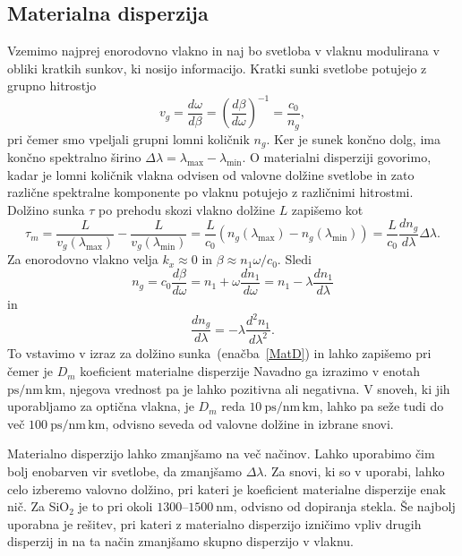 \subsection*{Materialna disperzija}
Vzemimo najprej enorodovno vlakno in naj bo svetloba v vlaknu modulirana
v obliki kratkih sunkov, ki nosijo informacijo. Kratki sunki svetlobe
potujejo z grupno hitrostjo 
\begin{equation}
v_{g}=\frac{d\omega}{d\beta}=\left(\frac{d\beta}{d\omega}\right)^{-1} = \frac{c_0}{n_g},
\label{9.51}
\end{equation}
pri čemer smo vpeljali grupni lomni količnik $n_g$.
Ker je sunek končno dolg, ima končno spektralno širino $\Delta \lambda=\lambda_{\mathrm{max}}-\lambda_{\mathrm{min}}$. 
O materialni disperziji govorimo, kadar je lomni količnik vlakna odvisen od
valovne dolžine svetlobe in zato različne spektralne komponente po vlaknu potujejo z različnimi
hitrostmi. Dolžino sunka $\tau$ po prehodu skozi vlakno dolžine $L$ zapišemo kot
\begin{equation}
\tau_m = \frac{L}{v_g(\lambda_{\mathrm{max}})} - \frac{L}{v_g(\lambda_{\mathrm{min}})} = 
\frac{L}{c_0}\left(n_g(\lambda_{\mathrm{max}}) - n_g(\lambda_{\mathrm{min}}) \right) 
= \frac{L}{c_0}\frac{d n_g}{d \lambda}\Delta \lambda.
\label{MatD}
\end{equation}
Za enorodovno vlakno velja $k_x \approx 0$ in $\beta \approx n_1 \omega/c_0$. 
Sledi
\begin{equation}
n_g = c_0 \frac{d\beta}{d\omega} = n_1 + \omega \frac{d n_1}{d\omega} = n_1 - \lambda 
\frac{dn_1}{d\lambda}
\end{equation}
in
\begin{equation}
\frac{dn_g}{d\lambda} = -\lambda\frac{d^2n_1}{d\lambda^2}.
\end{equation}
To vstavimo v izraz za dolžino sunka~(enačba~\ref{MatD}) in lahko zapišemo
pri čemer je $D_m$ koeficient materialne disperzije
Navadno ga izrazimo v enotah $\si{\pico\second/\nano\meter\, \kilo\meter}$, 
njegova vrednost pa je lahko pozitivna ali negativna. 
V snoveh, ki jih uporabljamo za optična vlakna, je $D_m$ reda 
$10~\si{\pico\second/\nano\meter\, \kilo\meter}$, lahko pa seže
tudi do več $100~\si{\pico\second/\nano\meter\, \kilo\meter}$, odvisno seveda od valovne dolžine
in izbrane snovi. 

Materialno disperzijo lahko zmanjšamo na več načinov. Lahko uporabimo čim bolj enobarven
vir svetlobe, da zmanjšamo $\Delta \lambda$. Za snovi, ki so v uporabi, 
lahko celo izberemo valovno dolžino, pri kateri je koeficient materialne disperzije enak nič.
Za SiO$_2$ je to pri okoli $1300$--$1500~\si{\nano\meter}$, odvisno od dopiranja stekla. Še najbolj uporabna je rešitev, pri kateri z materialno 
disperzijo izničimo vpliv drugih disperzij in 
na ta način zmanjšamo skupno disperzijo v vlaknu.

